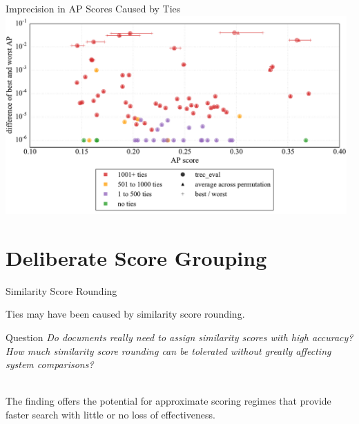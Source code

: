 \documentclass{beamer}
\begin{document}
\begin{frame}{Imprecision in AP Scores Caused by Ties}
\includegraphics[width=0.98\textwidth]{figs/fig-trec7-ap-scores.pdf}
\end{frame}

\section{Deliberate Score Grouping}
\begin{frame}{Similarity Score Rounding}

Ties may have been caused by {\color{blue}similarity score rounding}. \\[1em]

\begin{block}{Question}
\textit{Do documents really need to assign similarity scores with high accuracy? How much similarity score rounding can be tolerated without greatly affecting system comparisons?}
\end{block}
\\[1em]
The finding offers the potential for {\color{blue}approximate scoring regimes} that provide {\color{blue}faster search} with little or no loss of effectiveness.

\end{frame}
\end{document}
